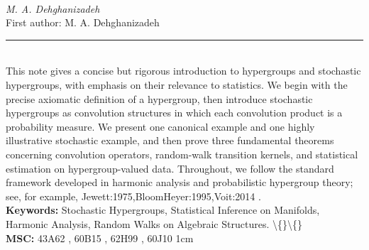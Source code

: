 \documentclass[10pt,twoside]{article}
\begin{document}
\noindent\begin{minipage}[t][\textheight]{\textwidth}
\\[0.35em]
{\itshape M. A. Dehghanizadeh}\\[0.2em]
{\footnotesize First author: M. A. Dehghanizadeh}\\[0.45em]
\noindent\rule{\textwidth}{0.3pt}\\[0.4em]
{\footnotesize  This note gives a concise but rigorous introduction to hypergroups and stochastic hypergroups, with emphasis on their relevance to statistics. We begin with the precise axiomatic definition of a hypergroup, then introduce stochastic hypergroups as convolution structures in which each convolution product is a probability measure. We present one canonical example and one highly illustrative stochastic example, and then prove three fundamental theorems concerning convolution operators, random-walk transition kernels, and statistical estimation on hypergroup-valued data. Throughout, we follow the standard framework developed in harmonic analysis and probabilistic hypergroup theory; see, for example, Jewett:1975,BloomHeyer:1995,Voit:2014 .}\\[0.4em]
{\footnotesize\bfseries Keywords:} {\footnotesize Stochastic Hypergroups, Statistical Inference on Manifolds, Harmonic Analysis, Random Walks on Algebraic Structures. \textbackslash\{\}\textbackslash\{\}}\\[0.15em]
{\footnotesize\bfseries MSC:} {\footnotesize 43A62 , 60B15 , 62H99 , 60J10 1cm}\\
\vfill
\end{minipage}
\newpage
\end{document}
